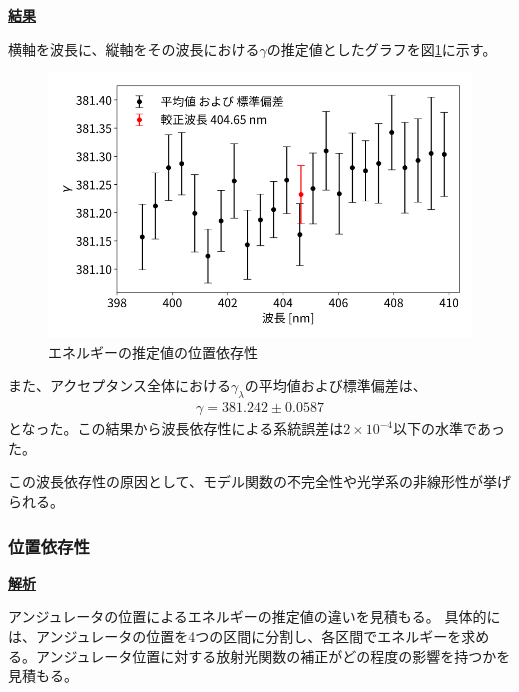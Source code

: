 \documentclass[a4paper,11pt,uplatex]{jsbook}
\begin{document}
\noindent \textbf{\underline{結果}}\par
横軸を波長に、縦軸をその波長における$\gamma$の推定値としたグラフを図\ref{wldep}に示す。
\begin{figure}[h]
  \centering
  \includegraphics[width=0.8\linewidth]{image/4-wldep.png}
  \caption{エネルギーの推定値の位置依存性}\label{wldep}
\end{figure}

また、アクセプタンス全体における$\gamma_\lambda$の平均値および標準偏差は、
\begin{eqnarray}
  \gamma = 381.242 \pm 0.0587
\end{eqnarray}
となった。この結果から波長依存性による系統誤差は$2\times10^{-4}$以下の水準であった。

この波長依存性の原因として、モデル関数の不完全性や光学系の非線形性が挙げられる。

\subsubsection{位置依存性}
\noindent \textbf{\underline{解析}}\par
アンジュレータの位置によるエネルギーの推定値の違いを見積もる。
具体的には、アンジュレータの位置を4つの区間に分割し、各区間でエネルギーを求める。アンジュレータ位置に対する放射光関数の補正がどの程度の影響を持つかを見積もる。
\end{document}
